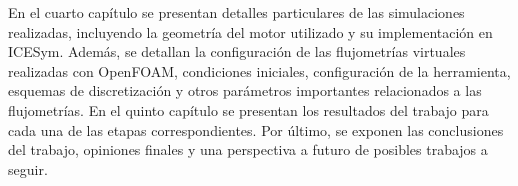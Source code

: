 %
En el cuarto capítulo se presentan detalles particulares de las simulaciones
realizadas, incluyendo la geometría del motor utilizado y su implementación en
ICESym.
%
Además, se detallan la configuración de las flujometrías virtuales realizadas
con OpenFOAM, condiciones iniciales, configuración de la herramienta, esquemas
de discretización y otros parámetros importantes relacionados a las
flujometrías.
%
%
En el quinto capítulo se presentan los resultados del trabajo para cada una de
las etapas correspondientes.
%
%
Por último, se exponen las conclusiones del trabajo, opiniones finales y una
perspectiva a futuro de posibles trabajos a seguir.
